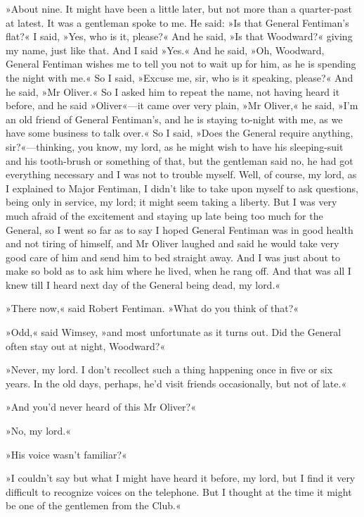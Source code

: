 »About nine. It might have been a little later, but not more than a quarter-past at latest. It was a gentleman spoke to me. He said: »Is that General Fentiman's flat?« I said, »Yes, who is it, please?« And he said, »Is that Woodward?« giving my name, just like that. And I said »Yes.« And he said, »Oh, Woodward, General Fentiman wishes me to tell you not to wait up for him, as he is spending the night with me.« So I said, »Excuse me, sir, who is it speaking, please?« And he said, »Mr Oliver.« So I asked him to repeat the name, not having heard it before, and he said »Oliver«---it came over very plain, »Mr Oliver,« he said, »I'm an old friend of General Fentiman's, and he is staying to-night with me, as we have some business to talk over.« So I said, »Does the General require anything, sir?«---thinking, you know, my lord, as he might wish to have his sleeping-suit and his tooth-brush or something of that, but the gentleman said no, he had got everything necessary and I was not to trouble myself. Well, of course, my lord, as I explained to Major Fentiman, I didn't like to take upon myself to ask questions, being only in service, my lord; it might seem taking a liberty. But I was very much afraid of the excitement and staying up late being too much for the General, so I went so far as to say I hoped General Fentiman was in good health and not tiring of himself, and Mr Oliver laughed and said he would take very good care of him and send him to bed straight away. And I was just about to make so bold as to ask him where he lived, when he rang off. And that was all I knew till I heard next day of the General being dead, my lord.«

»There now,« said Robert Fentiman. »What do you think of that?«

»Odd,« said Wimsey, »and most unfortunate as it turns out. Did the General often stay out at night, Woodward?«

»Never, my lord. I don't recollect such a thing happening once in five or six years. In the old days, perhaps, he'd visit friends occasionally, but not of late.«

»And you'd never heard of this Mr Oliver?«

»No, my lord.«

»His voice wasn't familiar?«

»I couldn't say but what I might have heard it before, my lord, but I find it very difficult to recognize voices on the telephone. But I thought at the time it might be one of the gentlemen from the Club.«

